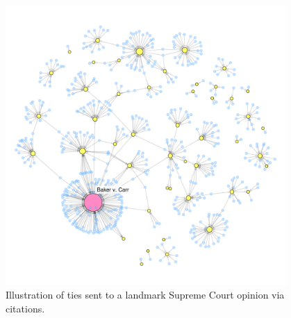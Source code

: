 \documentclass[headsepline=true, abstracton]{scrartcl}
\begin{document}
\begin{figure}[htp]
\centering
\includegraphics[width = 0.95\textwidth,trim= 0cm 3cm 6cm 8cm,clip=true ]{images/citations_pop.pdf}
\caption{Illustration of ties sent to a landmark Supreme Court opinion via citations.}
\label{fig:popularity}
\end{figure}
\end{document}
